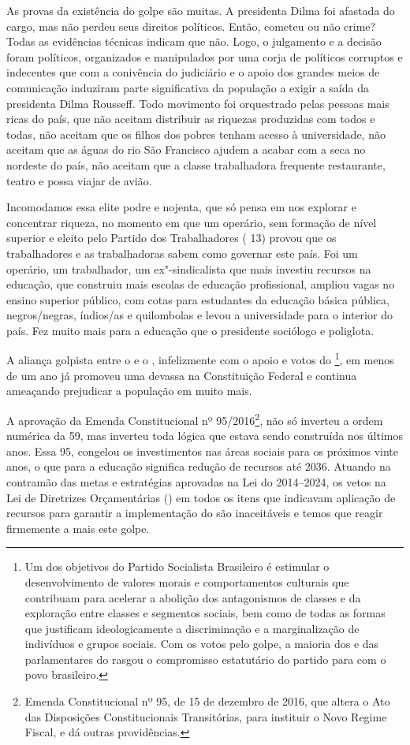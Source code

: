 As provas da existência do golpe são muitas. A presidenta Dilma foi
afastada do cargo, mas não perdeu seus direitos políticos. Então,
cometeu ou não crime? Todas as evidências técnicas indicam que não.
Logo, o julgamento e a decisão foram
políticos, organizados e manipulados por uma corja de políticos
corruptos e indecentes que com a conivência do judiciário e o apoio dos
grandes meios de comunicação induziram parte significativa da população
a exigir a saída da presidenta Dilma Rousseff. Todo movimento foi
orquestrado pelas pessoas mais ricas do país, que não aceitam distribuir
as riquezas produzidas com todos e todas, não aceitam que os filhos dos
pobres tenham acesso à universidade, não aceitam que as águas do rio São
Francisco ajudem a acabar com a seca no nordeste do país, não aceitam
que a classe trabalhadora frequente restaurante, teatro e possa viajar
de avião.

Incomodamos essa elite podre e nojenta, que só pensa em nos explorar e
concentrar riqueza, no momento em que um operário, sem formação de nível
superior e eleito pelo Partido dos Trabalhadores ( 13) provou que os
trabalhadores e as trabalhadoras sabem como governar este país. Foi um
operário, um trabalhador, um ex"-sindicalista que mais investiu recursos
na educação, que construiu mais escolas de educação profissional,
ampliou vagas no ensino superior público, com cotas para estudantes da
educação básica pública, negros/negras, índios/as e quilombolas e levou
a universidade para o interior do país. Fez muito mais para a educação
que o presidente sociólogo e poliglota.

A aliança golpista entre o  e o , infelizmente com o apoio
e votos do \footnote{Um dos objetivos do Partido
  Socialista Brasileiro é estimular o desenvolvimento de
  valores morais e comportamentos culturais que contribuam para acelerar
  a abolição dos antagonismos de classes e da exploração entre classes e
  segmentos sociais, bem como de todas as formas que justificam
  ideologicamente a discriminação e a marginalização de indivíduos e
  grupos sociais. Com os votos pelo golpe, a maioria dos e das
  parlamentares do  rasgou o compromisso estatutário do partido para
  com o povo brasileiro.}, em menos de um ano já promoveu uma devassa
na Constituição Federal e continua ameaçando prejudicar a população em
muito mais.

A aprovação da Emenda Constitucional nº 95/2016\footnote{Emenda
  Constitucional nº 95, de 15 de dezembro de 2016, que altera o Ato das
  Disposições Constitucionais Transitórias, para instituir o Novo Regime
  Fiscal, e dá outras providências.}, não só inverteu a ordem numérica
da  59, mas inverteu toda lógica que estava sendo construída nos
últimos anos. Essa  95, congelou os investimentos nas áreas sociais
para os próximos vinte anos, o que para a educação significa redução de
recursos até 2036. Atuando na contramão das metas e estratégias
aprovadas na Lei do  2014--2024, os vetos na Lei de Diretrizes
Orçamentárias () em todos os itens que indicavam aplicação de recursos
para garantir a implementação do  são inaceitáveis e temos que reagir
firmemente a mais este golpe.

